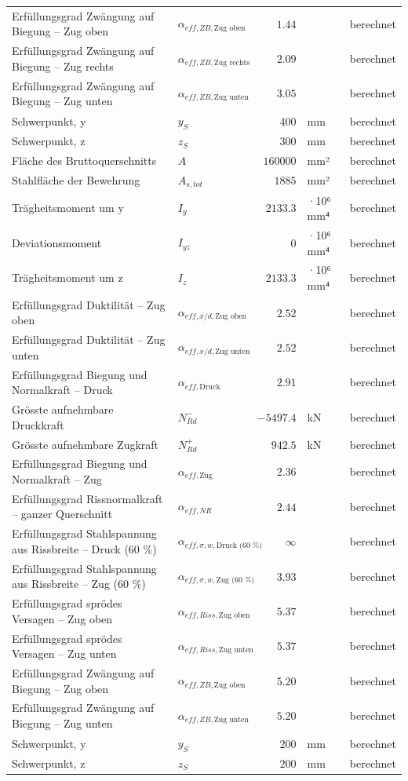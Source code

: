 \documentclass[11pt,a4paper]{article}
\begin{document}
\begin{xltabular}{\linewidth}{>{\raggedright\arraybackslash}Xlrll}
Erfüllungsgrad Zwängung auf Biegung – Zug oben & $\alpha_{eff,ZB,\text{Zug oben}}$ & $1.44$ &  & berechnet \\
Erfüllungsgrad Zwängung auf Biegung – Zug rechts & $\alpha_{eff,ZB,\text{Zug rechts}}$ & $2.09$ &  & berechnet \\
Erfüllungsgrad Zwängung auf Biegung – Zug unten & $\alpha_{eff,ZB,\text{Zug unten}}$ & $3.05$ &  & berechnet \\
Schwerpunkt, y & $y_S$ & $400$ & mm & berechnet \\
Schwerpunkt, z & $z_S$ & $300$ & mm & berechnet \\
Fläche des Bruttoquerschnitts & $A$ & $160000$ & mm² & berechnet \\
Stahlfläche der Bewehrung & $A_{s,tot}$ & $1885$ & mm² & berechnet \\
Trägheitsmoment um y & $I_y$ & $2133.3$ & ·10⁶ mm⁴ & berechnet \\
Deviationsmoment & $I_{yz}$ & $0$ & ·10⁶ mm⁴ & berechnet \\
Trägheitsmoment um z & $I_z$ & $2133.3$ & ·10⁶ mm⁴ & berechnet \\
Erfüllungsgrad Duktilität – Zug oben & $\alpha_{eff,x/d,\text{Zug oben}}$ & $2.52$ &  & berechnet \\
Erfüllungsgrad Duktilität – Zug unten & $\alpha_{eff,x/d,\text{Zug unten}}$ & $2.52$ &  & berechnet \\
Erfüllungsgrad Biegung und Normalkraft – Druck & $\alpha_{eff,\text{Druck}}$ & $2.91$ &  & berechnet \\
Grösste aufnehmbare Druckkraft & $N_{Rd}^{-}$ & $-5497.4$ & kN & berechnet \\
Grösste aufnehmbare Zugkraft & $N_{Rd}^{+}$ & $942.5$ & kN & berechnet \\
Erfüllungsgrad Biegung und Normalkraft – Zug & $\alpha_{eff,\text{Zug}}$ & $2.36$ &  & berechnet \\
Erfüllungsgrad Rissnormalkraft – ganzer Querschnitt & $\alpha_{eff,NR}$ & $2.44$ &  & berechnet \\
Erfüllungsgrad Stahlspannung aus Rissbreite – Druck (60 \%) & $\alpha_{eff,\sigma,w,\text{Druck (60 \%)}}$ & $\infty$ &  & berechnet \\
Erfüllungsgrad Stahlspannung aus Rissbreite – Zug (60 \%) & $\alpha_{eff,\sigma,w,\text{Zug (60 \%)}}$ & $3.93$ &  & berechnet \\
Erfüllungsgrad sprödes Versagen – Zug oben & $\alpha_{eff,Riss,\text{Zug oben}}$ & $5.37$ &  & berechnet \\
Erfüllungsgrad sprödes Versagen – Zug unten & $\alpha_{eff,Riss,\text{Zug unten}}$ & $5.37$ &  & berechnet \\
Erfüllungsgrad Zwängung auf Biegung – Zug oben & $\alpha_{eff,ZB,\text{Zug oben}}$ & $5.20$ &  & berechnet \\
Erfüllungsgrad Zwängung auf Biegung – Zug unten & $\alpha_{eff,ZB,\text{Zug unten}}$ & $5.20$ &  & berechnet \\
Schwerpunkt, y & $y_S$ & $200$ & mm & berechnet \\
Schwerpunkt, z & $z_S$ & $200$ & mm & berechnet \\
\hline
\end{xltabular}
\end{document}

